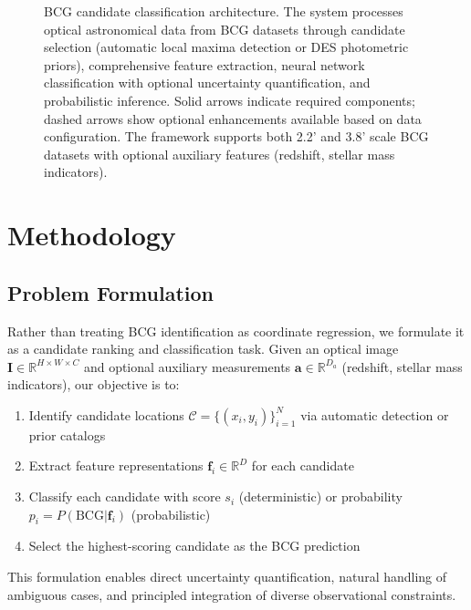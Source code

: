 \documentclass[twocolumn,10pt]{aastex631}
\begin{document}
\begin{figure*}[t]
{\begin{tikzpicture}
\end{tikzpicture}%
} %


\caption{BCG candidate classification architecture. The system processes optical astronomical data from BCG datasets through candidate selection (automatic local maxima detection or DES photometric priors), comprehensive feature extraction, neural network classification with optional uncertainty quantification, and probabilistic inference. Solid arrows indicate required components; dashed arrows show optional enhancements available based on data configuration. The framework supports both 2.2' and 3.8' scale BCG datasets with optional auxiliary features (redshift, stellar mass indicators).}
\label{fig:architecture}
\end{figure*}



\section{Methodology}

\subsection{Problem Formulation}

Rather than treating BCG identification as coordinate regression, we formulate it as a candidate ranking and classification task. Given an optical image $\mathbf{I} \in \mathbb{R}^{H \times W \times C}$ and optional auxiliary measurements $\mathbf{a} \in \mathbb{R}^{D_a}$ (redshift, stellar mass indicators), our objective is to:

\begin{enumerate}
\item Identify candidate locations $\mathcal{C} = \{(x_i, y_i)\}_{i=1}^{N}$ via automatic detection or prior catalogs
\item Extract feature representations $\mathbf{f}_i \in \mathbb{R}^{D}$ for each candidate
\item Classify each candidate with score $s_i$ (deterministic) or probability $p_i = P(\text{BCG}|\mathbf{f}_i)$ (probabilistic)
\item Select the highest-scoring candidate as the BCG prediction
\end{enumerate}

This formulation enables direct uncertainty quantification, natural handling of ambiguous cases, and principled integration of diverse observational constraints.
\end{document}
